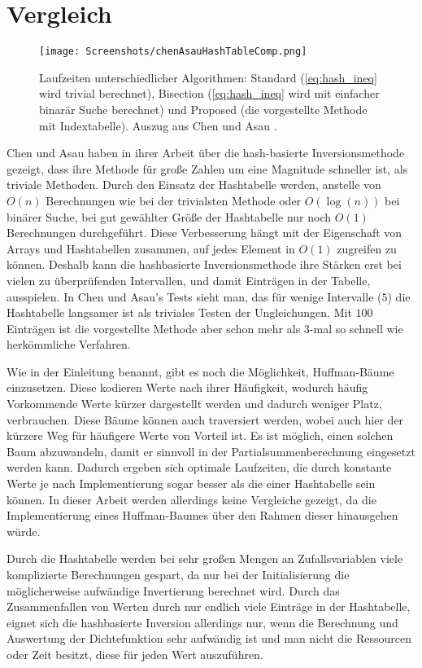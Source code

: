 \section{Vergleich}
\begin{figure}
    \centering
    \texttt{[image: Screenshots/chenAsauHashTableComp.png]}
    \caption{Laufzeiten unterschiedlicher Algorithmen: Standard (\eqref{eq:hash_ineq} wird trivial berechnet), 
        Bisection (\eqref{eq:hash_ineq} wird mit einfacher binarär Suche berechnet) und Proposed (die vorgestellte 
        Methode mit Indextabelle). Auszug aus Chen und Asau \cite{chen_asau-generating_random_variates-1974}.}
    \label{fig:computationTimeComp}
\end{figure}
Chen und Asau haben in ihrer Arbeit über die hash-basierte Inversionsmethode gezeigt, dass ihre Methode für große Zahlen
um eine Magnitude schneller ist, als triviale Methoden. Durch den Einsatz der Hashtabelle werden, anstelle von $O(n)$ 
Berechnungen wie bei der trivialsten Methode oder $O(\log(n))$ bei binärer Suche, bei gut gewählter Größe der Hashtabelle 
nur noch $O(1)$ Berechnungen durchgeführt. Diese Verbesserung hängt mit der Eigenschaft von Arrays und Hashtabellen zusammen, 
auf jedes Element in $O(1)$ zugreifen zu können. Deshalb kann die hashbasierte Inversionsmethode ihre Stärken erst bei vielen 
zu überprüfenden Intervallen, und damit Einträgen in der Tabelle, ausspielen. In Chen und Asau's Tests sieht man, das für wenige 
Intervalle ($5$) die Hashtabelle langsamer ist als triviales Testen der Ungleichungen. Mit $100$ Einträgen ist die 
vorgestellte Methode aber schon mehr als $3$-mal so schnell wie herkömmliche Verfahren.

Wie in der Einleitung benannt, gibt es noch die Möglichkeit, Huffman-Bäume einzusetzen. Diese kodieren Werte nach ihrer 
Häufigkeit, wodurch häufig Vorkommende Werte kürzer dargestellt werden und dadurch weniger Platz, verbrauchen. Diese Bäume können 
auch traversiert werden, wobei auch hier der kürzere Weg für häufigere Werte von Vorteil ist. Es ist möglich, einen solchen Baum 
abzuwandeln, damit er sinnvoll in der Partialsummenberechnung eingesetzt werden kann. Dadurch ergeben sich optimale Laufzeiten, die 
durch konstante Werte je nach Implementierung sogar besser als die einer Hashtabelle sein können. In dieser Arbeit werden allerdings 
keine Vergleiche gezeigt, da die Implementierung eines Huffman-Baumes über den Rahmen dieser hinausgehen würde.

Durch die Hashtabelle werden bei sehr großen Mengen an Zufallsvariablen viele komplizierte Berechnungen gespart, da nur bei der 
Initialisierung die möglicherweise aufwändige Invertierung berechnet wird. Durch das Zusammenfallen von Werten durch nur 
endlich viele Einträge in der Hashtabelle, eignet sich die hashbasierte Inversion allerdings nur, wenn die Berechnung und 
Auswertung der Dichtefunktion sehr aufwändig ist und man nicht die Ressourcen oder Zeit besitzt, diese für jeden Wert auszuführen.

